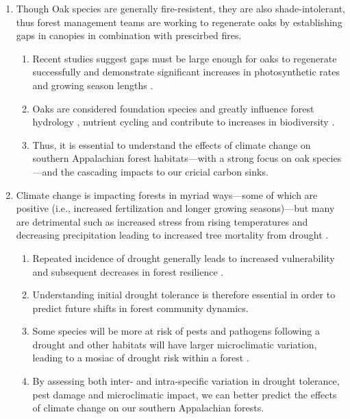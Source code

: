 \documentclass{article}\usepackage[]{graphicx}\usepackage[]{color}
\begin{document}
\begin{enumerate}
\item Though Oak species are generally fire-resistent, they are also shade-intolerant, thus forest management teams are working to regenerate oaks by establishing gaps in canopies in combination with prescirbed fires.
  \begin{enumerate}
  \item Recent studies suggest gaps must be large enough for oaks to regenerate successfully and demonstrate significant increases in photosynthetic rates and growing season lengths \citep{Zhang2020}. 
  \item Oaks are considered foundation species \citep{Ellison2005, Mitchell2019} and greatly influence forest hydrology \citep{Arthur2012}, nutrient cycling \citep{Arthur2012} and contribute to increases in biodiversity \citep{Mitchell2019, Izbicki2020}. 
  \item Thus, it is essential to understand the effects of climate change on southern Appalachian forest habitats---with a strong focus on oak species---and the cascading impacts to our cricial carbon sinks. 
  \end{enumerate}
  
\item Climate change is impacting forests in myriad ways---some of which are positive (i.e., increased  fertilization and longer growing seasons)---but many are detrimental such as increased stress from rising temperatures and decreasing precipitation leading to increased tree mortality from drought \citep{Ayers2000, Bachelet2001, Lloyd2007, Allen2010}.
  \begin{enumerate}
  \item Repeated incidence of drought generally leads to increased vulnerability and subsequent decreases in forest resilience \citep{Allen2010,Anderegg2020}. 
  \item Understanding initial drought tolerance is therefore essential in order to predict future shifts in forest community dynamics. 
  \item Some species will be more at risk of pests and pathogens following a drought and other habitats will have larger microclimatic variation, leading to a mosiac of drought risk within a forest \citep{Ayers2000,Anderegg2020}.
  \item By assessing both inter- and intra-specific variation in drought tolerance, pest damage and microclimatic impact, we can better predict the effects of climate change on our southern Appalachian forests. 
  \end{enumerate}
  

\end{enumerate}
\end{document}
